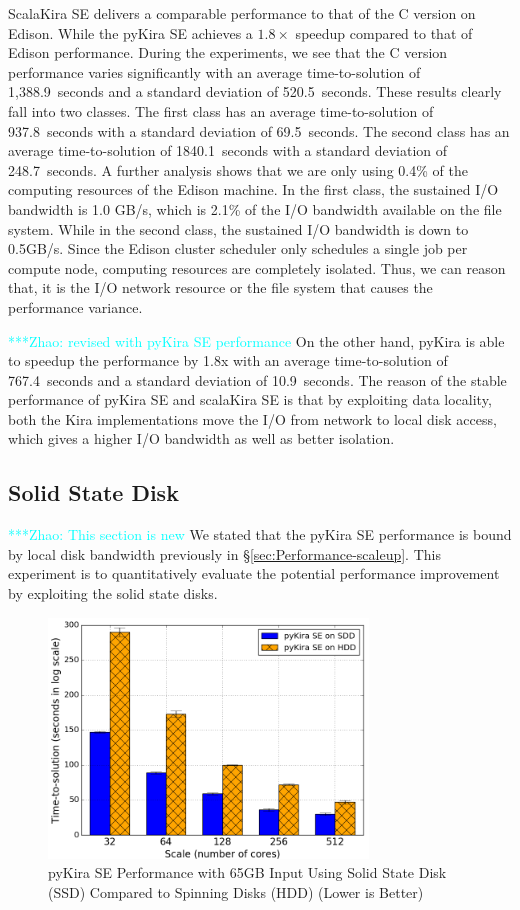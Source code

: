 \documentclass[10pt,journal,compsoc]{IEEEtran}
\newcommand{\zhaonote}[1]{{\textcolor{cyan}    { ***Zhao:      #1 }}}
\newcommand{\zhaonote}[1]{}
\begin{document}
ScalaKira SE delivers a comparable performance to that of the C version on Edison. 
While the pyKira SE achieves a $1.8\times$ speedup compared to that of Edison performance.
During the experiments, we see that the C version performance varies significantly with an 
average time-to-solution of 1,388.9~seconds and a standard deviation of 520.5~seconds. 
These results clearly fall into two classes. The first class has an average time-to-solution of 937.8~seconds
with a standard deviation of 69.5~seconds. The second class has an average time-to-solution 
of 1840.1~seconds with a standard deviation of 248.7~seconds. A further analysis shows that we are only 
using 0.4\% of the computing resources of the Edison machine. In the first class, the sustained
I/O bandwidth is 1.0 GB/s, which is 2.1\% of the I/O bandwidth available on the file system.
While in the second class, the sustained I/O bandwidth is down to 0.5GB/s.
Since the Edison cluster scheduler only schedules a single job per compute node, computing resources 
are completely isolated. Thus, we can reason that, it is the I/O network resource or the file system 
that causes the performance variance. 

\zhaonote{revised with pyKira SE performance}
On the other hand, pyKira is able to speedup the performance by 1.8x with an average time-to-solution of
767.4~seconds and a standard deviation of 10.9~seconds. The reason of the stable performance of pyKira SE
and scalaKira SE is that by exploiting data locality, both the Kira implementations move the I/O from network
to local disk access, which gives a higher I/O bandwidth as well as better isolation.

\subsection{Solid State Disk}
\zhaonote{This section is new}
We stated that the pyKira SE performance is bound by local disk bandwidth previously in \S\ref{sec:Performance-scaleup}.
This experiment is to quantitatively evaluate the potential performance improvement by exploiting the solid state disks.

\begin{figure}[h]
	\begin{center}
		\includegraphics[width=85mm]{pictures/ssd-65GB}
		\caption{pyKira SE Performance with 65GB Input Using Solid State Disk (SSD) Compared to Spinning Disks (HDD)  (Lower is Better)
		\label{fig:ssd-65GB}}
  	\end{center}
\end{figure}
\end{document}
